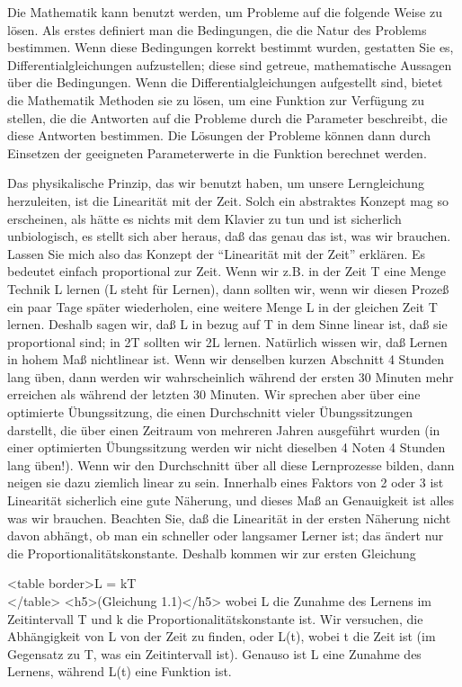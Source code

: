 Die Mathematik kann benutzt werden, um Probleme auf die folgende Weise zu lösen.
Als erstes definiert man die Bedingungen, die die Natur des Problems bestimmen.
Wenn diese Bedingungen korrekt bestimmt wurden, gestatten Sie es, Differentialgleichungen aufzustellen; diese sind getreue, mathematische Aussagen über die Bedingungen.
Wenn die Differentialgleichungen aufgestellt sind, bietet die Mathematik Methoden sie zu lösen, um eine Funktion zur Verfügung zu stellen, die die Antworten auf die Probleme durch die Parameter beschreibt, die diese Antworten bestimmen.
Die Lösungen der Probleme können dann durch Einsetzen der geeigneten Parameterwerte in die Funktion berechnet werden.

Das physikalische Prinzip, das wir benutzt haben, um unsere Lerngleichung herzuleiten, ist die Linearität mit der Zeit.
Solch ein abstraktes Konzept mag so erscheinen, als hätte es nichts mit dem Klavier zu tun und ist sicherlich unbiologisch, es stellt sich aber heraus, daß das genau das ist, was wir brauchen.
Lassen Sie mich also das Konzept der \enquote{Linearität mit der Zeit} erklären.
Es bedeutet einfach proportional zur Zeit.
Wenn wir z.B. in der Zeit T eine Menge Technik L lernen (L steht für Lernen), dann sollten wir, wenn wir diesen Prozeß ein paar Tage später wiederholen, eine weitere Menge L in der gleichen Zeit T lernen.
Deshalb sagen wir, daß L in bezug auf T in dem Sinne linear ist, daß sie proportional sind; in 2T sollten wir 2L lernen.
Natürlich wissen wir, daß Lernen in hohem Maß nichtlinear ist.
Wenn wir denselben kurzen Abschnitt 4 Stunden lang üben, dann werden wir wahrscheinlich während der ersten 30 Minuten mehr erreichen als während der letzten 30 Minuten.
Wir sprechen aber über eine optimierte Übungssitzung, die einen Durchschnitt vieler Übungssitzungen darstellt, die über einen Zeitraum von mehreren Jahren ausgeführt wurden (in einer optimierten Übungssitzung werden wir nicht dieselben 4 Noten 4 Stunden lang üben!).
Wenn wir den Durchschnitt über all diese Lernprozesse bilden, dann neigen sie dazu ziemlich linear zu sein.
Innerhalb eines Faktors von 2 oder 3 ist Linearität sicherlich eine gute Näherung, und dieses Maß an Genauigkeit ist alles was wir brauchen.
Beachten Sie, daß die Linearität in der ersten Näherung nicht davon abhängt, ob man ein schneller oder langsamer Lerner ist; das ändert nur die Proportionalitätskonstante.
Deshalb kommen wir zur ersten Gleichung

<table border>L = kT \\ </table>
<h5>(Gleichung 1.1)</h5>
wobei L die Zunahme des Lernens im Zeitintervall T und k die Proportionalitätskonstante ist.
Wir versuchen, die Abhängigkeit von L von der Zeit zu finden, oder L(t), wobei t die Zeit ist (im Gegensatz zu T, was ein Zeitintervall ist).
Genauso ist L eine Zunahme des Lernens, während L(t) eine Funktion ist.

